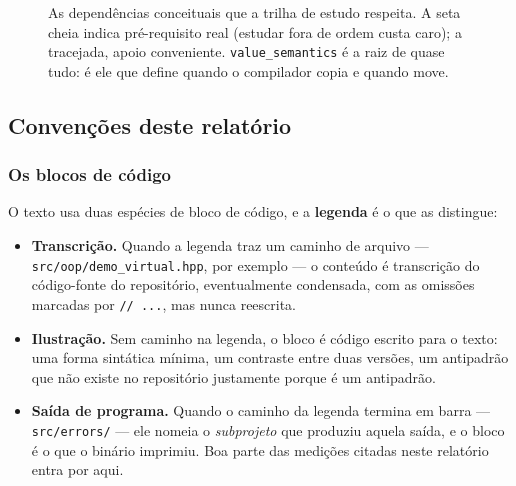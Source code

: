 \begin{figure}[htbp]
\caption{As dependências conceituais que a trilha de estudo respeita. A seta
         cheia indica pré-requisito real (estudar fora de ordem custa caro); a
         tracejada, apoio conveniente. \texttt{value\_semantics} é a raiz de
         quase tudo: é ele que define quando o compilador copia e quando move.}
\label{fig:dependencias}
\end{figure}

\subsection{Convenções deste relatório}
\label{sec:convencoes}

\subsubsection{Os blocos de código}

O texto usa duas espécies de bloco de código, e a \textbf{legenda} é o que as
distingue:

\begin{itemize}
    \item \textbf{Transcrição.} Quando a legenda traz um caminho de arquivo ---
          \texttt{src/oop/demo\_virtual.hpp}, por exemplo --- o conteúdo é
          transcrição do código-fonte do repositório, eventualmente condensada,
          com as omissões marcadas por \texttt{// ...}, mas nunca reescrita.
    \item \textbf{Ilustração.} Sem caminho na legenda, o bloco é código escrito
          para o texto: uma forma sintática mínima, um contraste entre duas
          versões, um antipadrão que não existe no repositório justamente
          porque é um antipadrão.
    \item \textbf{Saída de programa.} Quando o caminho da legenda termina em
          barra --- \texttt{src/errors/} --- ele nomeia o \emph{subprojeto} que
          produziu aquela saída, e o bloco é o que o binário imprimiu. Boa parte
          das medições citadas neste relatório entra por aqui.
\end{itemize}


